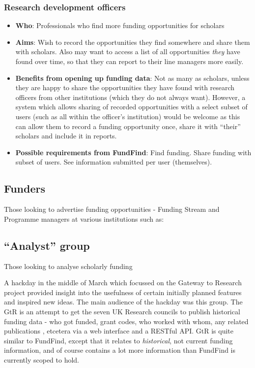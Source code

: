 \subsubsection{Research development officers}
\label{audience-research-officers}
\begin{itemize}
 \item \textbf{Who}: Professionals who find more funding opportunities for scholars
 \item \textbf{Aims}: Wish to record the opportunities they find somewhere and share them with scholars. Also may want to access a list of all opportunities \emph{they} have found over time, so that they can report to their line managers more easily.
 \item \textbf{Benefits from opening up funding data}: Not as many as scholars, unless they are happy to share the opportunities they have found with research officers from other institutions (which they do not always want). However, a system which allows sharing of recorded opportunities with a select subset of users (such as all within the officer's institution) would be welcome as this can allow them to record a funding opportunity once, share it with ``their'' scholars and include it in reports.
 \item \textbf{Possible requirements from FundFind}: Find funding. Share funding with subset of users. See information submitted per user (themselves).
\end{itemize}

\subsection{Funders}
Those looking to advertise funding opportunities - Funding Stream and Programme managers at various institutions such as:

\subsection{``Analyst'' group}
\label{audience-analyst}
Those looking to analyse scholarly funding

A hackday in the middle of March which focussed on the Gateway to Research project provided insight into the usefulness of certain initially planned features and inspired new ideas. The main audience of the hackday was this group. The GtR is an attempt to get the seven UK Research councils to publish historical funding data - who got funded, grant codes, who worked with whom, any related publications \cite{gtr}, etcetera via a web interface and a RESTful API. GtR is quite similar to FundFind, except that it relates to \emph{historical}, not current funding information, and of course contains a lot more information than FundFind is currently scoped to hold.

